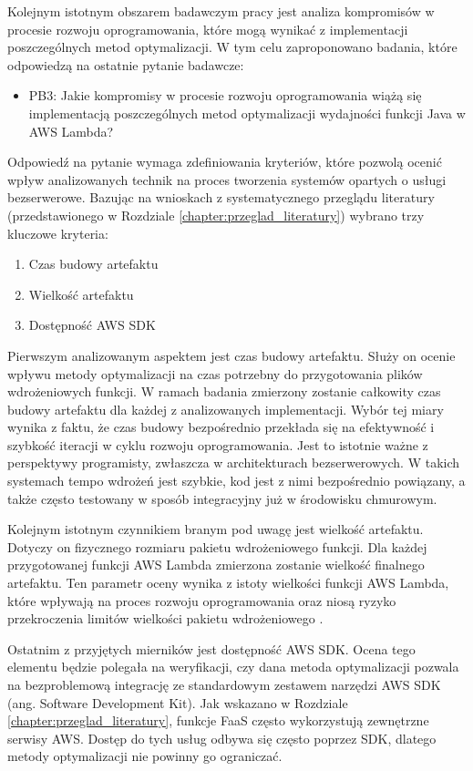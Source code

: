 Kolejnym istotnym obszarem badawczym pracy jest analiza kompromisów w procesie rozwoju oprogramowania, które mogą wynikać z implementacji poszczególnych metod optymalizacji.
W tym celu zaproponowano badania, które odpowiedzą na ostatnie pytanie badawcze:
\begin{itemize}
    \item PB3: Jakie kompromisy w procesie rozwoju oprogramowania wiążą się implementacją poszczególnych metod optymalizacji wydajności funkcji Java w AWS Lambda?
\end{itemize}
Odpowiedź na pytanie wymaga zdefiniowania kryteriów, które pozwolą ocenić wpływ analizowanych technik na proces tworzenia systemów opartych o usługi bezserwerowe. 
Bazując na wnioskach z systematycznego przeglądu literatury (przedstawionego w Rozdziale \ref{chapter:przeglad_literatury}) wybrano trzy kluczowe kryteria:
\begin{enumerate}
    \item Czas budowy artefaktu
    \item Wielkość artefaktu
    \item Dostępność AWS SDK
\end{enumerate}

Pierwszym analizowanym aspektem jest czas budowy artefaktu. Służy on ocenie wpływu metody optymalizacji na czas potrzebny do przygotowania plików wdrożeniowych funkcji. W ramach badania zmierzony zostanie całkowity czas budowy artefaktu dla każdej z analizowanych implementacji. Wybór tej miary wynika z faktu, że czas budowy bezpośrednio przekłada się na efektywność i szybkość iteracji w cyklu rozwoju oprogramowania. Jest to istotnie ważne z perspektywy programisty, zwłaszcza w architekturach bezserwerowych. W takich systemach tempo wdrożeń jest szybkie, kod jest z nimi bezpośrednio powiązany, a także często testowany w sposób integracyjny już w środowisku chmurowym.

Kolejnym istotnym czynnikiem branym pod uwagę jest wielkość artefaktu. Dotyczy on fizycznego rozmiaru pakietu wdrożeniowego funkcji. Dla każdej przygotowanej funkcji AWS Lambda zmierzona zostanie wielkość finalnego artefaktu. Ten parametr oceny wynika z istoty wielkości funkcji AWS Lambda, które wpływają na proces rozwoju oprogramowania oraz niosą ryzyko przekroczenia limitów wielkości pakietu wdrożeniowego \cite{9095731}.

Ostatnim z przyjętych mierników jest dostępność AWS SDK. Ocena tego elementu będzie polegała na weryfikacji, czy dana metoda optymalizacji pozwala na bezproblemową integrację ze standardowym zestawem narzędzi AWS SDK (ang. Software Development Kit). Jak wskazano w Rozdziale \ref{chapter:przeglad_literatury}, funkcje FaaS często wykorzystują zewnętrzne serwisy AWS. Dostęp do tych usług odbywa się często poprzez SDK, dlatego metody optymalizacji nie powinny go ograniczać.

